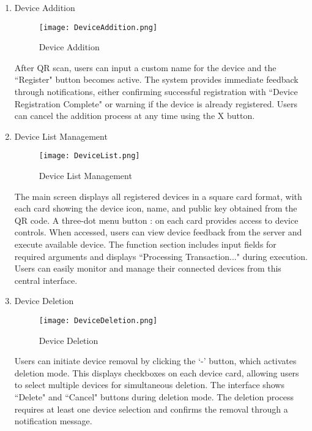 \documentclass[conference]{IEEEtran}
\begin{document}
\begin{enumerate}[itemsep=2ex, parsep=1ex]
\begin{enumerate}
		\item Device Addition

        \begin{figure}[h!]
            \centering
            \texttt{[image: DeviceAddition.png]}
            \caption{Device Addition}
            \label{fig:enter-label}
        \end{figure}
        
        After QR scan, users can input a custom name for the device and the ``Register" button becomes active. The system provides immediate feedback through notifications, either confirming successful registration with ``Device Registration Complete" or warning if the device is already registered. Users can cancel the addition process at any time using the X button.
		                  
		\item Device List Management

        \begin{figure}[h!]
            \centering
            \texttt{[image: DeviceList.png]}
            \caption{Device List Management}
            \label{fig:enter-label}
        \end{figure}
        
        The main screen displays all registered devices in a square card format, with each card showing the device icon, name, and public key obtained from the QR code. A three-dot menu button : on each card provides access to device controls. When accessed, users can view device feedback from the server and execute available device. The function section includes input fields for required arguments and displays ``Processing Transaction..." during execution. Users can easily monitor and manage their connected devices from this central interface.

        \clearpage
		                  
		\item Device Deletion
        
        \begin{figure}[h!]
            \centering
            \texttt{[image: DeviceDeletion.png]}
            \caption{Device Deletion}
            \label{fig:enter-label}
        \end{figure}
        
        Users can initiate device removal by clicking the `-' button, which activates deletion mode. This displays checkboxes on each device card, allowing users to select multiple devices for simultaneous deletion. The interface shows ``Delete" and ``Cancel" buttons during deletion mode. The deletion process requires at least one device selection and confirms the removal through a notification message.
	\end{enumerate}
	        

\end{enumerate}
\end{document}
